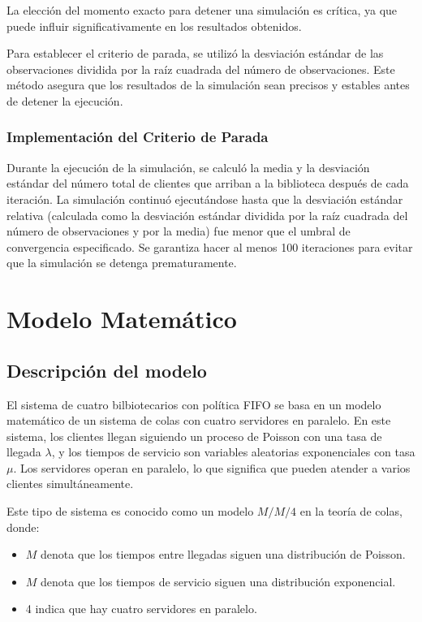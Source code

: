 \documentclass[10pt,twocolumn]{article}
\begin{document}
La elección del momento exacto para detener una simulación es crítica, ya que puede influir significativamente en los resultados obtenidos.

Para establecer el criterio de parada, se utilizó la desviación estándar de las observaciones dividida por la raíz cuadrada del número de observaciones. Este método asegura que los resultados de la simulación sean precisos y estables antes de detener la ejecución. 

\subsubsection{Implementación del Criterio de Parada}

Durante la ejecución de la simulación, se calculó la media y la desviación estándar del número total de clientes que arriban a la biblioteca después de cada iteración. La simulación continuó ejecutándose hasta que la desviación estándar relativa (calculada como la desviación estándar dividida por la raíz cuadrada del número de observaciones y por la media) fue menor que el umbral de convergencia especificado. Se garantiza hacer al menos 100 iteraciones para evitar que la simulación se detenga prematuramente.



\section{Modelo Matemático}

\subsection{Descripción del modelo}

El sistema de cuatro bilbiotecarios con política FIFO se basa en un modelo matemático de un sistema de colas con cuatro servidores en paralelo. En este sistema, los clientes llegan siguiendo un proceso de Poisson con una tasa de llegada $\lambda$, y los tiempos de servicio son variables aleatorias exponenciales con tasa $\mu$. Los servidores operan en paralelo, lo que significa que pueden atender a varios clientes simultáneamente.

Este tipo de sistema es conocido como un modelo $M/M/4$ en la teoría de colas, donde:

\begin{itemize}
	\item $M$ denota que los tiempos entre llegadas siguen una distribución de Poisson.
	\item $M$ denota que los tiempos de servicio siguen una distribución exponencial.
	\item 4 indica que hay cuatro servidores en paralelo.
\end{itemize}
\end{document}

